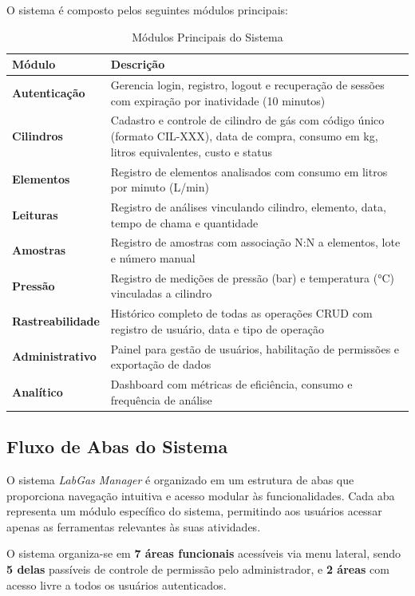 \documentclass[12pt,a4paper]{article}
\begin{document}
O sistema é composto pelos seguintes módulos principais:

\begin{table}[h!]
\centering
\caption{Módulos Principais do Sistema}
\label{tab:modulos}
\begin{tabular}{@{}ll@{}}
\toprule
\textbf{Módulo} & \textbf{Descrição} \\
\midrule
\textbf{Autenticação} & Gerencia login, registro, logout e recuperação de sessões com expiração por inatividade (10 minutos) \\
\textbf{Cilindros} & Cadastro e controle de cilindro de gás com código único (formato CIL-XXX), data de compra, consumo em kg, litros equivalentes, custo e status \\
\textbf{Elementos} & Registro de elementos analisados com consumo em litros por minuto (L/min) \\
\textbf{Leituras} & Registro de análises vinculando cilindro, elemento, data, tempo de chama e quantidade \\
\textbf{Amostras} & Registro de amostras com associação N:N a elementos, lote e número manual \\
\textbf{Pressão} & Registro de medições de pressão (bar) e temperatura (°C) vinculadas a cilindro \\
\textbf{Rastreabilidade} & Histórico completo de todas as operações CRUD com registro de usuário, data e tipo de operação \\
\textbf{Administrativo} & Painel para gestão de usuários, habilitação de permissões e exportação de dados \\
\textbf{Analítico} & Dashboard com métricas de eficiência, consumo e frequência de análise \\
\bottomrule
\end{tabular}
\end{table}

\subsection{Fluxo de Abas do Sistema}

O sistema \textit{LabGas Manager} é organizado em um estrutura de abas que proporciona navegação intuitiva e acesso modular às funcionalidades. Cada aba representa um módulo específico do sistema, permitindo aos usuários acessar apenas as ferramentas relevantes às suas atividades.

O sistema organiza-se em \textbf{7 áreas funcionais} acessíveis via menu lateral, sendo \textbf{5 delas} passíveis de controle de permissão pelo administrador, e \textbf{2 áreas} com acesso livre a todos os usuários autenticados.
\end{document}
